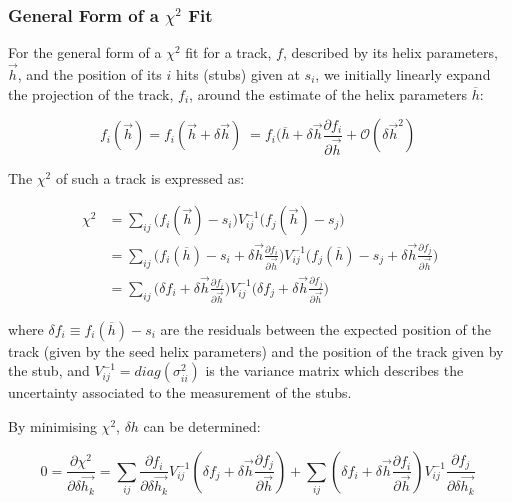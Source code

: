 \subsubsection{General Form of a $\chi^{2}$ Fit}\label{subsubsec:chi2maths}
For the general form of a $\chi^{2}$ fit for a track, $f$, described by its helix parameters, $\overrightarrow{h}$, and 
the position of its $i$ hits (\ie stubs) given at $s_{i}$, we initially linearly expand the projection of the track, $f_{i}$, around the estimate of the helix parameters $\overline{h}$:

\begin{equation}
f_{i}(\overrightarrow{h} ) = f_{i}(\overrightarrow{h} + \delta \overrightarrow{h}) \;
                           = f_{i}(\overline{h} + \delta \overrightarrow{h} \frac{\partial f_{i}}{\partial \overrightarrow{h}} + \mathcal{O}(\delta \overrightarrow{h}^{2}) \;
\label{eq:chi1}
\end{equation}

The $\chi^{2}$ of such a track is expressed as:

\begin{equation}
\begin{split}
\chi^{2} &= \sum_{ij} \big(f_{i}(\overrightarrow{h}) - s_{i} \big) V^{-1}_{ij}  \big(f_{j}(\overrightarrow{h}) - s_{j} \big)  \\
         &= \sum_{ij} \big( f_{i}(\overline{h})  - s_{i} + \delta \overrightarrow{h} \frac{\partial f_{i}}{\partial \overrightarrow{h}} \big) V^{-1}_{ij}  \big( f_{j}(\overline{h})  - s_{j} + \delta \overrightarrow{h} \frac{\partial f_{j}}{\partial \overrightarrow{h}} \big)  \\
         &= \sum_{ij} \big( \delta f_{i} + \delta \overrightarrow{h} \frac{\partial f_{i}}{\partial \overrightarrow{h}} \big) V^{-1}_{ij}  \big( \delta f_{j} + \delta \overrightarrow{h} \frac{\partial f_{j}}{\partial \overrightarrow{h}} \big)
\end{split}
\label{eq:chi2}
\end{equation}

where $\delta f_{i} \equiv f_{i}(\overline{h}) - s_{i}$ are the residuals between the expected position of the track (given by the seed helix parameters) and the position of the track given by the stub, and $V^{-1}_{ij} = diag(\sigma^{2}_{ii})$ is the variance matrix which describes the uncertainty associated to the measurement of the stubs.

By minimising $\chi^{2}$, $\delta h$ can be determined:

\begin{equation}
0 = \frac{\partial \chi^{2}}{\partial \delta \overrightarrow{h_{k}}} = \sum_{ij} \frac{\partial f_{i}}{\partial \delta \overrightarrow{h_{k}}} V^{-1}_{ij} ( \delta f_{j} + \delta \overrightarrow{h} \frac{\partial f_{j}}{\partial \overrightarrow{h}} ) + \sum_{ij}	( \delta f_{i} + \delta \overrightarrow{h} \frac{\partial f_{i}}{\partial \overrightarrow{h}} ) V^{-1}_{ij} \frac{\partial f_{j}}{\partial \delta \overrightarrow{h_{k}}}  \;
\label{eq:chi3}
\end{equation}

